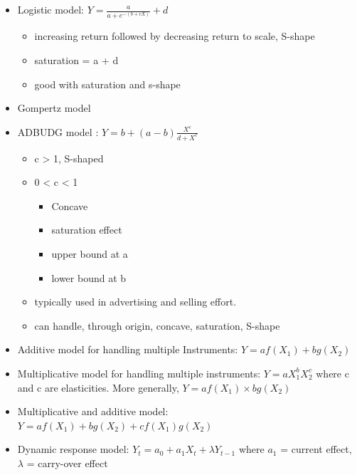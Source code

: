 \documentclass[
]{book}
\begin{document}
\begin{itemize}
  \begin{itemize}
  \item
    Decreasing returns and saturation
  \item
    upper bound = a + c
  \item
    lower bound = c
  \item
    typically used in selling effort
  \end{itemize}
\item
  Logistic model: \(Y = \frac{a}{a+ e^{-(b+cX)}}+d\)

  \begin{itemize}
  \item
    increasing return followed by decreasing return to scale, S-shape
  \item
    saturation = a + d
  \item
    good with saturation and s-shape
  \end{itemize}
\item
  Gompertz model
\item
  ADBUDG model \citep{Little_1970} : \(Y = b + (a-b)\frac{X^c}{d + X^c}\)

  \begin{itemize}
  \item
    c \textgreater{} 1, S-shaped
  \item
    0 \textless{} c \textless{} 1

    \begin{itemize}
    \item
      Concave
    \item
      saturation effect
    \item
      upper bound at a
    \item
      lower bound at b
    \end{itemize}
  \item
    typically used in advertising and selling effort.
  \item
    can handle, through origin, concave, saturation, S-shape
  \end{itemize}
\item
  Additive model for handling multiple Instruments: \(Y = af(X_1) + bg(X_2)\)
\item
  Multiplicative model for handling multiple instruments: \(Y = aX_1^b X_2^c\) where c and c are elasticities. More
  generally, \(Y = af(X_1)\times bg(X_2)\)
\item
  Multiplicative and additive model: \(Y = af(X_1) + bg(X_2) + cf(X_1) g(X_2)\)
\item
  Dynamic response model: \(Y_t = a_0 + a_1 X_t + \lambda Y_{t-1}\) where \(a_1\) = current effect, \(\lambda\) = carry-over
  effect
\end{itemize}
\end{document}

